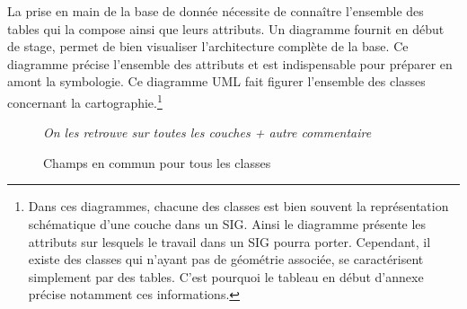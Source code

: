 \documentclass{themeensg}
\begin{document}
\begin{appendices} 
\label{beginappendices}



\label{annexearchitecure}

La prise en main de la base de donnée nécessite de connaître l'ensemble des tables qui la compose ainsi que leurs attributs. Un diagramme fournit en début de stage, permet de bien visualiser l'architecture complète de la base. Ce diagramme précise l'ensemble des attributs et est indispensable pour préparer en amont la symbologie. Ce diagramme UML fait figurer l'ensemble des classes concernant la cartographie.\footnote{Dans ces diagrammes, chacune des classes est bien souvent la représentation schématique d'une couche dans un SIG. Ainsi le diagramme présente les attributs sur lesquels le travail dans un SIG pourra porter. Cependant, il existe des classes qui n'ayant pas de géométrie associée, se caractérisent simplement par des tables. C'est pourquoi le tableau en début d'annexe précise notamment ces informations.}





\begin{figure}[!h]
\centering
{}
\caption{Champs en commun pour tous les classes}%
\textit{On les retrouve sur toutes les couches + autre commentaire }
\label{fig:graphics}%
\end{figure}


\end{appendices}
\end{document}
